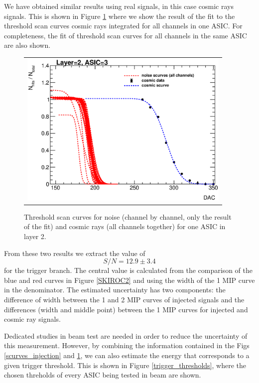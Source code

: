 \documentclass[a4paper,11pt]{article}
\begin{document}
We have obtained similar results using real signals, in this case cosmic rays signals. This is shown 
in Figure \ref{scurves_cosmics}  where 
we show the result of the fit to the threshold scan curves cosmic rays integrated for all channels
in one ASIC. For completeness, the fit of threshold scan curves for all channels
in the same ASIC are also shown.

\begin{figure}[!ht]
    \centering
  \begin{tabular}{l}
	\includegraphics[width=4in]{../figs/commissioning/cosmic_scurves_asic3_layer2.eps} 
	\end{tabular}
\caption{Threshold scan curves for noise (channel by channel, only the result of the fit) and cosmic rays (all channels together) for one ASIC in layer 2.}
\label{scurves_cosmics}
\end{figure}

From these two results we extract the value of
\begin{equation}
  S/N=12.9\pm3.4
\end{equation}
for the trigger branch. The central value is calculated from the comparison of the blue and red curves
in Figure \ref{SKIROC2} and using the width of the 1 MIP curve in the denominator. The estimated
uncertainty has two components: the difference of width between the 1 and 2 MIP curves of injected signals and the differences (width and middle point) between the 1 MIP curves for injected and
cosmic ray signals.

Dedicated studies in beam test are needed in order to
reduce the uncertainty of this measurement.
However, by combining the information contained in the Figs \ref{scurves_injection} and \ref{scurves_cosmics}, we can also estimate the energy that corresponds
to a given trigger threshold.
This is shown in Figure \ref{trigger_thresholds}, where the chosen threholds of every ASIC being tested
in beam are shown.
\end{document}
